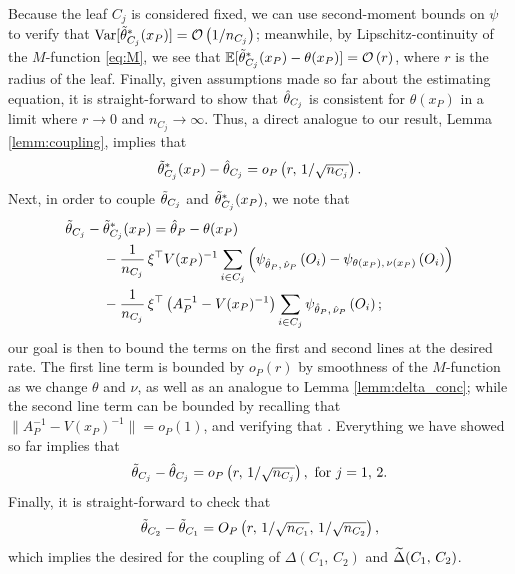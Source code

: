 \documentclass[aos]{imsart}
\theoremstyle{plain}
\theoremstyle{definition}
\theoremstyle{remark}
\begin{document}
\begin{CJK}{UTF8}{gbsn}
\begin{appendix}
Because the leaf $C_j$ is considered fixed, we can use second-moment bounds on $\psi$
to verify that $\operatorname{Var}[\tilde{\theta}_{C_j}^*(x_P)] = \mathcal{O}\left(1/n_{C_j}\right)$; meanwhile,
by Lipschitz-continuity of the $M$-function \eqref{eq:M}, we see that
$\mathbb{E}[\tilde{\theta}_{C_j}^*(x_P) - \theta(x_P)] = \mathcal{O}\left(r\right)$, where $r$ is the radius
of the leaf. Finally, given assumptions made so far about the estimating equation,
it is straight-forward to show that $\hat{\theta}_{C_j}$ is consistent for $\theta(x_P)$ in a
limit where $r \rightarrow 0$ and $n_{C_j} \rightarrow \infty$. Thus, a direct analogue to
our result, Lemma \ref{lemm:coupling}, implies that
\begin{equation}
\ttheta_{C_j}^*(x_P) - \htheta_{C_j} = o_P\p{r, \, 1/\sqrt{n_{C_j}}}.
\end{equation}
Next, in order to couple $\tilde{\theta}_{C_j}$ and $\tilde{\theta}_{C_j}^*(x_P)$, we note that
\begin{equation}
\begin{split}
&\ttheta_{C_j} - \ttheta_{C_j}^*(x_P) = \htheta_P - \theta(x_P) \\
&\ \ \ \ \ \ \ \ 
- \frac{1}{n_{C_j}} \, \xi^\top V(x_P)^{-1}\sum_{i \in C_j}  \p{\psi_{\htheta_P, \, \hnu_P}\p{O_i} -  \psi_{\theta(x_P), \, \nu(x_P)}\p{O_i}} \\
& \ \ \ \ \ \ \ \ 
 - \frac{1}{n_{C_j}} \, \xi^\top \p{A_P^{-1} - V(x_P)^{-1}} \sum_{i \in C_j} \psi_{\htheta_P, \, \hnu_P}\p{O_i};
\end{split}
\end{equation}
our goal is then to bound the terms on the first and second lines at the desired rate.
The first line term is bounded by $o_P(r)$ by smoothness of the $M$-function as
we change $\theta$ and $\nu$, as well as an analogue to Lemma \ref{lemm:delta_conc};
while the second line term can be bounded by recalling that $\|A_P^{-1} - V(x_P)^{-1}\| = o_P(1)$,
and verifying that .
Everything we have showed so far implies that
\begin{equation}
\ttheta_{C_j} - \htheta_{C_j} = o_P\p{r, \, 1/\sqrt{n_{C_j}}}, \eqfor j = 1, \, 2.
\end{equation}
Finally, it is straight-forward to check that
\begin{equation}
\ttheta_{C_2} - \ttheta_{C_1} = O_P\p{r, \, 1/\sqrt{n_{C_1}}, \, 1/\sqrt{n_{C_2}}},
\end{equation}
which implies the desired for the coupling of $\Delta(C_1, \, C_2)$ and $\widetilde{\Delta}(C_1, \, C_2)$.


\end{appendix}
\end{CJK}
\end{document}
